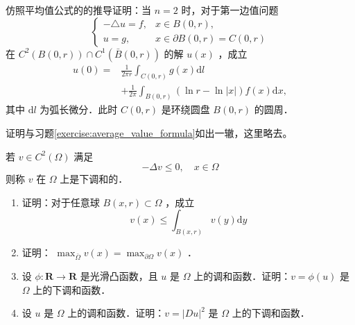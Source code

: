 \documentclass{mynote}
\begin{document}
\begin{exercise}
    仿照平均值公式的的推导证明：当 $n=2$ 时，对于第一边值问题
$$
\begin{cases}-\triangle u=f, & x \in B(0, r), \\ u=g, & x \in \partial B(0, r)=C(0, r)\end{cases}
$$
在 $C^2(B(0, r)) \cap C^1(\bar{B}(0, r))$ 的解 $u(x)$ ，成立
$$
\begin{aligned}
u(0)= & \frac{1}{2 \pi r} \int_{C(0, r)} g(x) \mathrm{d} l \\
& +\frac{1}{2 \pi} \int_{B(0, r)}(\ln r-\ln |x|) f(x) \mathrm{d} x,
\end{aligned}
$$
其中 $\mathrm{d} l$ 为弧长微分．此时 $C(0, r)$ 是环绕圆盘 $B(0, r)$ 的圆周．
\end{exercise}

证明与习题\ref{exercise:average_value_formula}如出一辙，这里略去。

\begin{exercise}
    若 $v \in C^2(\Omega)$ 满足
$$
-\Delta v \leq 0, \quad x \in \Omega
$$
则称 $v$ 在 $\Omega$ 上是下调和的．
\begin{enumerate}
    \item 证明：对于任意球 $B(x, r) \subset \Omega$ ，成立
$$
v(x) \leq \int_{B(x, r)} v(y) \mathrm{d} y
$$
    \item 证明： $\max _{\bar{\Omega}} v(x)=\max _{\partial \Omega} v(x)$ ．
    \item 设 $\phi: \mathbf{R} \rightarrow \mathbf{R}$ 是光滑凸函数，且 $u$ 是 $\Omega$ 上的调和函数．证明：$v=\phi(u)$ 是 $\Omega$ 上的下调和函数．
    \item 设 $u$ 是 $\Omega$ 上的调和函数．证明：$v=|D u|^2$ 是 $\Omega$ 上的下调和函数．
\end{enumerate}
\end{exercise}
\end{document}
